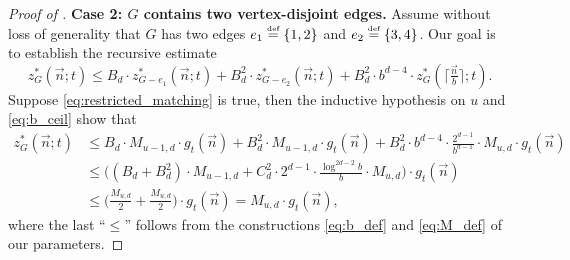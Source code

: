 \documentclass[11pt]{article}
\theoremstyle{definition}
\newcommand*{\eqdef}{\stackrel{\mbox{\normalfont\tiny def}}{=}} %
\newcommand*{\vn}{\vec{n}}
\begin{document}
\begin{proof}[Proof of ]
    \medskip
    \noindent\textbf{Case 2: $G$ contains two vertex-disjoint edges.} Assume without loss of generality that $G$ has two edges $e_1 \eqdef \{1, 2\}$ and $e_2 \eqdef \{3, 4\}$. Our goal is to establish the recursive estimate
    \begin{equation} \label{eq:restricted_matching}
        z^*_G(\vn; t) \le B_d \cdot z^*_{G - e_1}(\vn; t) + B_d^2 \cdot z^*_{G - e_2}(\vn; t) + B_d^2 \cdot b^{d-4} \cdot z^*_G(\lceil\tfrac{\vn}{b}\rceil; t). 
    \end{equation} 
    Suppose \eqref{eq:restricted_matching} is true, then the inductive hypothesis on $u$ and \eqref{eq:b_ceil} show that
    \begin{align*}
        z^*_G(\vn; t) &\le B_d \cdot M_{u-1, d} \cdot g_t(\vn) + B_d^2 \cdot M_{u-1, d} \cdot g_t(\vn) + B_d^2 \cdot b^{d-4} \cdot \tfrac{2^{d-1}}{b^{d-1}} \cdot M_{u, d} \cdot g_t(\vn) \\
        &\le \bigl( (B_d+B_d^2) \cdot M_{u-1, d} + C_d^2  \cdot 2^{d-1} \cdot \tfrac{\log^{2d-2} b}{b} \cdot M_{u, d} \bigr) \cdot g_t(\vn) \\
        &\le \bigl( \tfrac{M_{u, d}}{2} + \tfrac{M_{u, d}}{2} \bigr) \cdot g_t(\vn) = M_{u, d} \cdot g_t(\vn), 
    \end{align*} 
    where the last ``$\le$'' follows from the constructions \eqref{eq:b_def} and \eqref{eq:M_def} of our parameters. 
    
    \smallskip
    

\end{proof}
\end{document}
